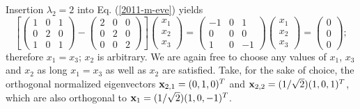 {Insertion  $\lambda_2=2$ into Eq. (\ref{2011-m-eve}) yields
\begin{equation}
\left[
\begin{pmatrix}
1&0&1\\
0&2&0\\
1&0&1
\end{pmatrix}  -
\begin{pmatrix}
2&0&0\\
0&2&0\\
0&0&2
\end{pmatrix}
\right]
\begin{pmatrix}
x_1\\
x_2\\
x_3
\end{pmatrix}
=
\begin{pmatrix}
-1&0&1\\
0&0&0\\
1&0&-1
\end{pmatrix}
\begin{pmatrix}
x_1\\
x_2\\
x_3
\end{pmatrix}
=
\begin{pmatrix}
0\\
0\\
0
\end{pmatrix}
;
\end{equation}
therefore $x_1=x_3$; $x_2$ is arbitrary.
We are again free to choose any values of $x_1$, $x_3$ and $x_2$ as long
 $x_1=x_3$ as well as $x_2$ are satisfied.
Take, for the sake of choice, the orthogonal
normalized eigenvectors
${\bf x}_{2,1} = (0,1,0)^T$ and
${\bf x}_{2,2} = (1/\sqrt{2})(1,0,1)^T$,
which are also orthogonal to ${\bf x}_1 =(1/\sqrt{2})(1,0,-1)^T$.

}
